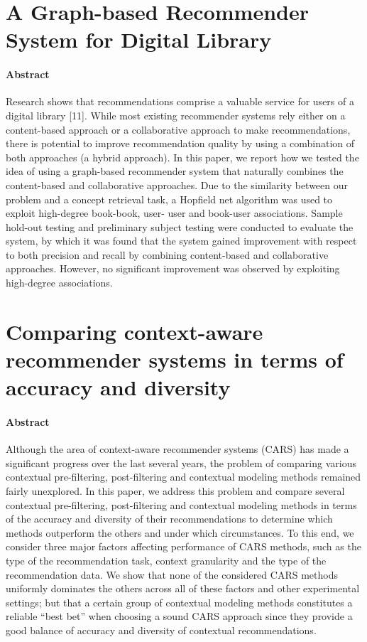 \documentclass[oneside]{book}
\begin{document}
\section{A Graph-based Recommender System for Digital Library}
\paragraph{Abstract}
Research  shows  that  recommendations  comprise  a  valuable  
service for users of a digital library [11]. While most existing 
recommender   systems   rely   either   on   a   content-based   
approach     or     a     collaborative     approach     to     make     
recommendations,     there     is     potential     to     improve     
recommendation  quality  by  using  a  combination  of  both  
approaches (a hybrid approach). In this paper, we report how 
we  tested  the  idea  of  using  a  graph-based  recommender  
system   that   naturally   combines   the   content-based   and   
collaborative  approaches.  Due  to  the  similarity  between  our  
problem   and   a   concept   retrieval   task,   a   Hopfield   net   
algorithm  was  used  to  exploit  high-degree  book-book,  user-
user and book-user associations. Sample hold-out testing and 
preliminary  subject  testing  were  conducted  to  evaluate  the  
system,  by  which  it  was  found  that  the  system  gained  
improvement  with  respect  to  both  precision  and  recall  by  
combining   content-based   and   collaborative   approaches.   
However,   no   significant   improvement   was   observed   by   
exploiting high-degree associations. 
\section{Comparing context-aware recommender systems in terms of accuracy and diversity}
\paragraph{Abstract}
Although the area of context-aware recommender systems (CARS) has made a significant progress over the last several years, the problem of comparing various contextual pre-filtering, post-filtering and contextual modeling methods remained fairly unexplored. In this paper, we address this problem and compare several contextual pre-filtering, post-filtering and contextual modeling methods in terms of the accuracy and diversity of their recommendations to determine which methods outperform the others and under which circumstances. To this end, we consider three major factors affecting performance of CARS methods, such as the type of the recommendation task, context granularity and the type of the recommendation data. We show that none of the considered CARS methods uniformly dominates the others across all of these factors and other experimental settings; but that a certain group of contextual modeling methods constitutes a reliable “best bet” when choosing a sound CARS approach since they provide a good balance of accuracy and diversity of contextual recommendations.
\end{document}
